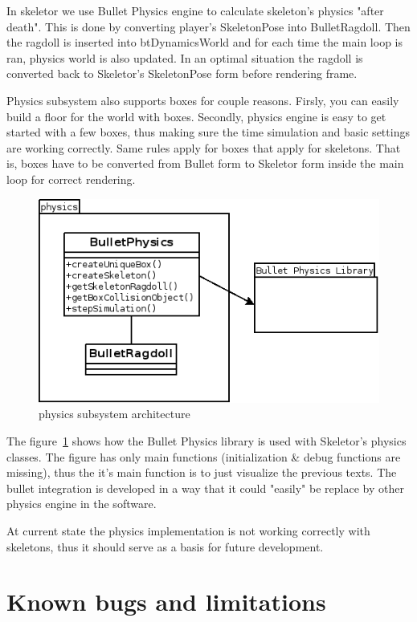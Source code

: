 \documentclass[11pt,twoside,a4paper]{article}
\begin{document}
In skeletor we use Bullet Physics engine to calculate skeleton's physics "after death". This is done by converting player's SkeletonPose into BulletRagdoll. Then the ragdoll is inserted into btDynamicsWorld and for each time the main loop is ran, physics world is also updated. In an optimal situation the ragdoll is converted back to Skeletor's SkeletonPose form before rendering frame.

Physics subsystem also supports boxes for couple reasons. Firsly, you can easily build a floor for the world with boxes. Secondly, physics engine is easy to get started with a few boxes, thus making sure the time simulation and basic settings are working correctly. Same rules apply for boxes that apply for skeletons. That is, boxes have to be converted from Bullet form to Skeletor form inside the main loop for correct rendering.

\begin{figure}
  \centering
    \includegraphics[scale=0.7]{physics_subsystem.png}
  \caption{physics subsystem architecture}
  \label{physicssubsys}
\end{figure}

The figure~\ref{physicssubsys} shows how the Bullet Physics library is used with Skeletor's physics classes. The figure has only main functions (initialization \& debug functions are missing), thus the it's main function is to just visualize the previous texts. The bullet integration is developed in a way that it could "easily" be replace by other physics engine in the software.

At current state the physics implementation is not working correctly with skeletons, thus it should serve as a basis for future development.

\section{Known bugs and limitations}
\end{document}
